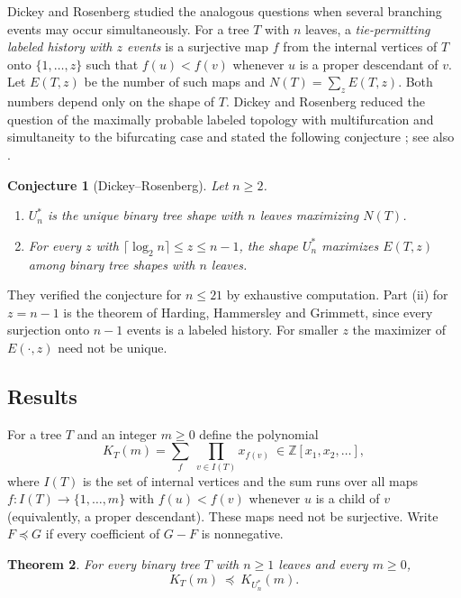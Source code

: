 \documentclass[11pt]{amsart}
\newtheorem{theorem}{Theorem}[section]
\newtheorem{conjecture}[theorem]{Conjecture}
\theoremstyle{definition}
\theoremstyle{remark}
\newcommand{\pre}{\preceq}
\begin{document}
Dickey and Rosenberg \cite{DR2025,DR2026,DR2026b} studied the analogous questions when several branching events may occur simultaneously.
For a tree $T$ with $n$ leaves, a \emph{tie-permitting labeled history with $z$ events} is a surjective map $f$ from the internal vertices of $T$ onto $\{1,\dots,z\}$ such that $f(u)<f(v)$ whenever $u$ is a proper descendant of $v$.
Let $E(T,z)$ be the number of such maps and $N(T)=\sum_{z}E(T,z)$.
Both numbers depend only on the shape of $T$.
Dickey and Rosenberg reduced the question of the maximally probable labeled topology with multifurcation and simultaneity to the bifurcating case and stated the following conjecture \cite[Conjecture~14]{DR2026}; see also \cite[Conjecture~20]{DR2026b}.

\begin{conjecture}[Dickey--Rosenberg]\label{conj:DR}
Let $n\ge 2$.
\begin{enumerate}
\item[(i)] $U^*_n$ is the unique binary tree shape with $n$ leaves maximizing $N(T)$.
\item[(ii)] For every $z$ with $\lceil\log_2 n\rceil\le z\le n-1$, the shape $U^*_n$ maximizes $E(T,z)$ among binary tree shapes with $n$ leaves.
\end{enumerate}
\end{conjecture}

They verified the conjecture for $n\le 21$ by exhaustive computation.
Part (ii) for $z=n-1$ is the theorem of Harding, Hammersley and Grimmett, since every surjection onto $n-1$ events is a labeled history.
For smaller $z$ the maximizer of $E(\cdot,z)$ need not be unique.

\subsection*{Results}
For a tree $T$ and an integer $m\ge 0$ define the polynomial
\begin{equation}\label{eq:K}
K_T(m)=\sum_{f}\ \prod_{v\in I(T)}x_{f(v)}\ \in\mathbb{Z}[x_1,x_2,\dots],
\end{equation}
where $I(T)$ is the set of internal vertices and the sum runs over all maps $f\colon I(T)\to\{1,\dots,m\}$ with $f(u)<f(v)$ whenever $u$ is a child of $v$ (equivalently, a proper descendant).
These maps need not be surjective.
Write $F\pre G$ if every coefficient of $G-F$ is nonnegative.

\begin{theorem}\label{thm:main}
For every binary tree $T$ with $n\ge1$ leaves and every $m\ge 0$,
\[
K_T(m)\ \pre\ K_{U^*_n}(m).
\]
\end{theorem}
\end{document}
